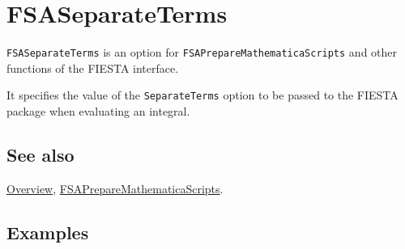 \documentclass[../FeynHelpersManual.tex]{subfiles}
\begin{document}
\begin{Shaded}
\begin{Highlighting}[]
 
\end{Highlighting}
\end{Shaded}

\hypertarget{fsaseparateterms}{
\section{FSASeparateTerms}\label{fsaseparateterms}}

\texttt{FSASeparateTerms} is an option for
\texttt{FSAPrepareMathematicaScripts} and other functions of the FIESTA
interface.

It specifies the value of the \texttt{SeparateTerms} option to be passed
to the FIESTA package when evaluating an integral.

\subsection{See also}

\hyperlink{toc}{Overview},
\hyperlink{fsapreparemathematicascripts}{FSAPrepareMathematicaScripts}.

\subsection{Examples}
\end{document}
